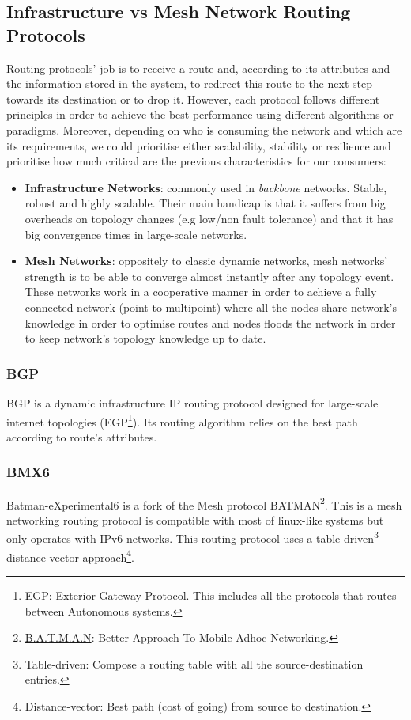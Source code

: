 \subsection{Infrastructure vs Mesh Network Routing Protocols}
\label{subsec:dsrp}
Routing protocols' job is to receive a route and, according to its attributes and the information stored in the system, to redirect this route to the next step towards its destination or to drop it. However, each protocol follows different principles in order to achieve the best performance using different algorithms or paradigms. Moreover, depending on who is consuming the network and which are its requirements, we could prioritise either scalability, stability or resilience and prioritise how much critical are the previous characteristics for our consumers:

\begin{itemize}
    \item \textbf{Infrastructure Networks}: commonly used in \textit{backbone} networks. Stable, robust and highly scalable. Their main handicap is that it suffers from big overheads on topology changes (e.g low/non fault tolerance) and that it has big convergence times in large-scale networks.
    \item \textbf{Mesh Networks}: oppositely to classic dynamic networks, mesh networks' strength is to be able to converge almost instantly after any topology event. These networks work in a cooperative manner in order to achieve a fully connected network (point-to-multipoint) where all the nodes share network's knowledge in order to optimise routes and nodes floods the network in order to keep network's topology knowledge up to date.
\end{itemize}

\subsubsection{BGP}
\label{subsubsec:bgp}
BGP is a dynamic infrastructure IP routing protocol designed for large-scale internet topologies (EGP\footnote{EGP: Exterior Gateway Protocol. This includes all the protocols that routes between Autonomous systems.}). Its routing algorithm relies on the best path according to route's attributes.

\subsubsection{BMX6}
\label{subsec:bmx6}
Batman-eXperimental6 \cite{bmx6} is a fork of the Mesh protocol BATMAN\footnote{\href{https://www.open-mesh.org/projects/open-mesh/wiki}{B.A.T.M.A.N}: Better Approach To Mobile Adhoc Networking.}. This is a mesh networking routing protocol is compatible with most of linux-like systems but only operates with IPv6 networks. This routing protocol uses a table-driven\footnote{Table-driven: Compose a routing table with all the source-destination entries.} distance-vector approach\footnote{Distance-vector: Best path (cost of going) from source to destination.}.

